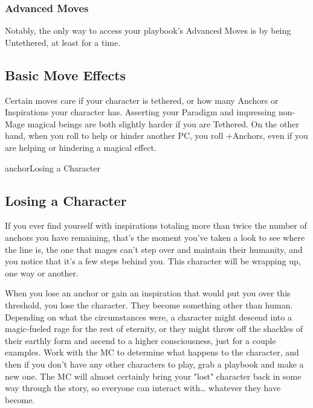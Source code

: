 \documentclass[
  oneside,
  statementpaper,
  9pt]{memoir}
\begin{document}
\hypertarget{advanced-moves}{%
\subsubsection{Advanced Moves}\label{advanced-moves}}

\begin{Player}

Notably, the only way to access your playbook’s Advanced Moves is by being Untethered, at least for a time. 

\end{Player}

\hypertarget{basic-move-effects}{%
\subsection{Basic Move Effects}\label{basic-move-effects}}

\begin{Player}

Certain moves care if your character is tethered, or how many Anchors or Inspirations your character has. Asserting your Paradigm and impressing non-Mage magical beings are both slightly harder if you are Tethered. On the other hand, when you roll to help or hinder another PC, you roll +Anchors, even if you are helping or hindering a magical effect.

{{anchorLosing a Character}}

\end{Player}

\hypertarget{losing-a-character}{%
\subsection{Losing a Character}\label{losing-a-character}}

\begin{Player}

If you ever find yourself with inspirations totaling more than twice the number of anchors you have remaining, that’s the moment you’ve taken a look to see where the line is, the one that mages can’t step over and maintain their humanity, and you notice that it’s a few steps behind you. This character will be wrapping up, one way or another. 

When you lose an anchor or gain an inspiration that would put you over this threshold, you lose the character. They become something other than human. Depending on what the circumstances were, a character might descend into a magic-fueled rage for the rest of eternity, or they might throw off the shackles of their earthly form and ascend to a higher consciousness, just for a couple examples. Work with the MC to determine what happens to the character, and then if you don’t have any other characters to play, grab a playbook and make a new one. The MC will almost certainly bring your "lost" character back in some way through the story, so everyone can interact with… whatever they have become.

\end{Player}
\end{document}
